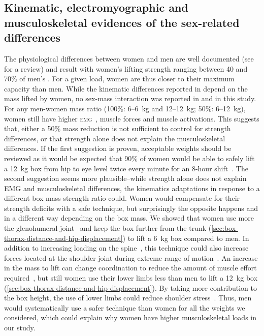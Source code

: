 \subsection{Kinematic, electromyographic and musculoskeletal evidences of the sex-related differences}\label{subsec:kinematic,-electromyographic-and-musculoskeletal-evidences-of-the-sex-related-differences}

The physiological differences between women and men are well documented (see \citet{Cote2012-hn} for a review) and result with women’s lifting strength ranging between 40 and 70\% of men’s \citet{Kumar2004-fv}.
For a given load, women are thus closer to their maximum capacity than men.
While the kinematic differences reported in \citet{Martinez2019-mm} depend on the mass lifted by women, no sex-mass interaction was reported in \citet{Bouffard2019-fd} and in this study.
For any men-women mass ratio (100\%: 6--6~kg and 12--12~kg;
50\%: 6--12~kg), women still have higher \textsc{emg}~\cite{Bouffard2019-fd}, muscle forces and muscle activations.
This suggests that, either a 50\% mass reduction is not sufficient to control for strength differences, or that strength alone does not explain the musculoskeletal differences.
If the first suggestion is proven, acceptable weights should be reviewed as it would be expected that 90\% of women would be able to safely lift a 12~kg box from hip to eye level twice every minute for an 8-hour shift~\cite{Waters1993-nk,Waters2016-lw}.
The second suggestion seems more plausible--while strength alone does not explain EMG and musculoskeletal differences, the kinematics adaptations in response to a different box mass-strength ratio could.
Women would compensate for their strength deficits with a safe technique, but surprisingly the opposite happens and in a different way depending on the box mass.
We showed that women use more the glenohumeral joint~\cite{Martinez2019-mm} and keep the box further from the trunk (\ref{sec:box-thorax-distance-and-hip-displacement}) to lift a 6~kg box compared to men.
In addition to increasing loading on the spine~\cite{Marras2006-jq}, this technique could also increase forces located at the shoulder joint during extreme range of motion~\cite{Kim2003-lf}.
An increase in the mass to lift can change coordination to reduce the amount of muscle effort required~\cite{Burgess-Limerick1995-uh}, but still women use their lower limbs less than men to lift a 12~kg box (\ref{sec:box-thorax-distance-and-hip-displacement}).
By taking more contribution to the box height, the use of lower limbs could reduce shoulder stress~\cite{Kim2003-lf}.
Thus, men would systematically use a safer technique than women for all the weights we considered, which could explain why women have higher musculoskeletal loads in our study.

